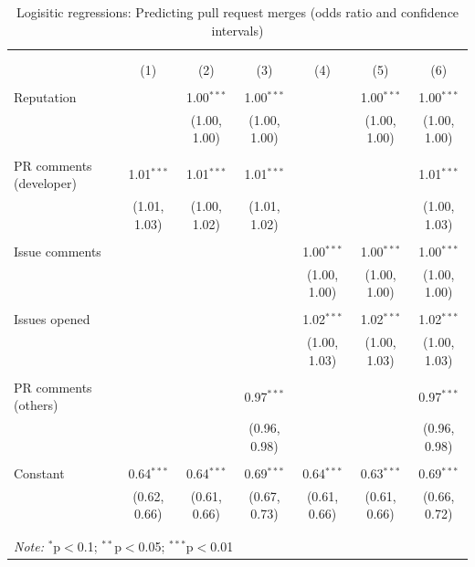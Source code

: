 \documentclass{sigchi}
\begin{document}
\begin{table}[!htbp] \centering 
  \caption{Logisitic regressions: Predicting pull request merges (odds ratio and confidence intervals)} 
  \label{} 
\begin{tabular}{@{\extracolsep{5pt}}lcccccc} 
\\[-1.8ex]\hline 
\hline \\[-1.8ex] 
\\[-1.8ex] & (1) & (2) & (3) & (4) & (5) & (6)\\ 
\hline \\[-1.8ex] 
 Reputation &  & 1.00$^{***}$ & 1.00$^{***}$ &  & 1.00$^{***}$ & 1.00$^{***}$ \\ 
  &  & (1.00, 1.00) & (1.00, 1.00) &  & (1.00, 1.00) & (1.00, 1.00) \\ 
  & & & & & & \\
 PR comments (developer) & 1.01$^{***}$ & 1.01$^{***}$ & 1.01$^{***}$ &  &  & 1.01$^{***}$ \\ 
  & (1.01, 1.03) & (1.00, 1.02) & (1.01, 1.02) &  &  & (1.00, 1.03) \\ 
  & & & & & & \\ 
 Issue comments &  &  &  & 1.00$^{***}$ & 1.00$^{***}$ & 1.00$^{***}$ \\ 
  &  &  &  & (1.00, 1.00) & (1.00, 1.00) & (1.00, 1.00) \\ 
  & & & & & & \\ 
 Issues opened &  &  &  & 1.02$^{***}$ & 1.02$^{***}$ & 1.02$^{***}$ \\ 
  &  &  &  & (1.00, 1.03) & (1.00, 1.03) & (1.00, 1.03) \\ 
  & & & & & & \\ 
  PR comments (others) &  &  & 0.97$^{***}$ &  &  & 0.97$^{***}$ \\ 
   &  &  & (0.96, 0.98) &  &  & (0.96, 0.98) \\ 
   & & & & & & \\
 Constant & 0.64$^{***}$ & 0.64$^{***}$ & 0.69$^{***}$ & 0.64$^{***}$ & 0.63$^{***}$ & 0.69$^{***}$ \\ 
  & (0.62, 0.66) & (0.61, 0.66) & (0.67, 0.73) & (0.61, 0.66) & (0.61, 0.66) & (0.66, 0.72) \\ 
  & & & & & & \\ 
\hline \\[-1.8ex] 

\multicolumn{7}{l}{\textit{Note:} $^{*}$p$<$0.1; $^{**}$p$<$0.05; $^{***}$p$<$0.01} \\ 
\end{tabular} 
\end{table}
\end{document}
